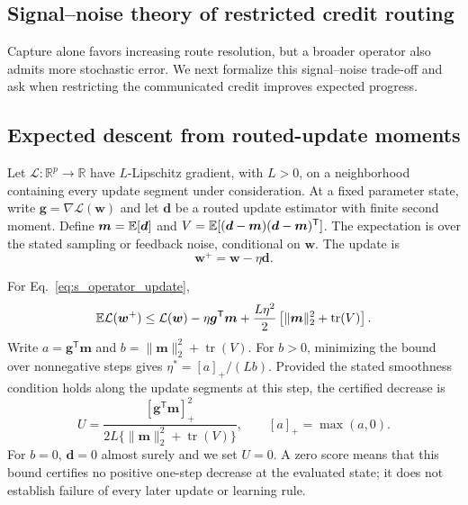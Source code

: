 \subsection{Signal--noise theory of restricted credit routing}
\label{note:credit_phase_theory}

Capture alone favors increasing route resolution, but a broader operator also
admits more stochastic error. We next formalize this signal--noise trade-off
and ask when restricting the communicated credit improves expected progress.

\subsection{Expected descent from routed-update moments}

Let $\mathcal L:\mathbb R^p\rightarrow\mathbb R$ have $L$-Lipschitz gradient,
with $L>0$, on a neighborhood containing every update segment under consideration. At a fixed
parameter state, write $\bm g=\nabla\mathcal L(\bm w)$ and let $\bm d$ be a
routed update estimator with finite second moment. Define
$\bm m=\mathbb{E}[\bm d]$ and
$V=\mathbb{E}[(\bm d-\bm m)(\bm d-\bm m)^{\mathsf T}]$. The expectation is over
the stated sampling or feedback noise, conditional on $\bm w$. The update is
\begin{equation}
\bm w^+=\bm w-\eta\bm d.
\label{eq:s_operator_update}
\end{equation}

\begin{proposition}
For Eq.~\ref{eq:s_operator_update},
\begin{equation}
\mathbb{E}\mathcal L(\bm w^+)\leq\mathcal L(\bm w)
-\eta\bm g^{\mathsf T}\bm m
+\frac{L\eta^2}{2}\left[
\lVert\bm m\rVert_2^2+\operatorname{tr}(V)
\right].
\label{eq:s_operator_bound}
\end{equation}
Write $a=\bm g^{\mathsf T}\bm m$ and
$b=\lVert\bm m\rVert_2^2+\operatorname{tr}(V)$. For $b>0$, minimizing
the bound over nonnegative steps gives $\eta^*=[a]_+/(Lb)$. Provided the
stated smoothness condition holds along the update segments at this step,
the certified decrease is
\begin{equation}
U=\frac{[\bm g^{\mathsf T}\bm m]_+^2}
{2L\{\lVert\bm m\rVert_2^2+\operatorname{tr}(V)\}},
\qquad [a]_+=\max(a,0).
\label{eq:s_operator_utility}
\end{equation}
For $b=0$, $\bm d=0$ almost surely and we set $U=0$. A zero score means
that this bound certifies no positive one-step decrease at the evaluated
state; it does not establish failure of every later update or learning rule.
\end{proposition}


